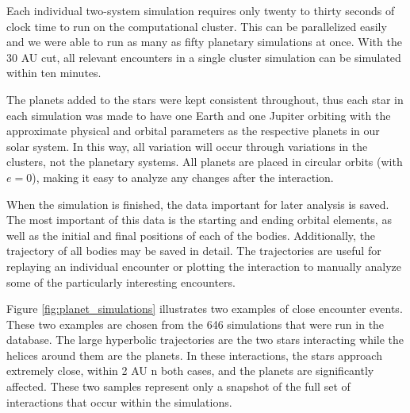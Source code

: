 \documentclass[12pt]{article}
\begin{document}

    Each individual two-system simulation requires only twenty to thirty
    seconds of clock time to run on the computational cluster. This can be
    parallelized easily and we were able to run as many as fifty
    planetary simulations at once. With the 30 AU cut, all relevant encounters 
    in a single cluster simulation can be simulated within ten minutes.

    The planets added to the stars were kept consistent throughout, thus 
    each star in each simulation was made to have one Earth and one Jupiter
    orbiting with the approximate physical and orbital
    parameters as the respective planets in our solar system. 
    In this way, all variation will occur through variations in the clusters, not
    the planetary systems.
    All planets are
    placed in circular orbits (with $e=0$), making it easy to analyze
    any changes after the interaction.

    When the simulation is finished, the data important for later analysis is
    saved. The most important of this data is the starting and ending
    orbital elements, as well as the initial and final positions of each of the bodies.
    Additionally, the trajectory of all bodies may be saved in detail. 
    The trajectories are useful for replaying an individual encounter or plotting the
    interaction to manually analyze some of the particularly interesting 
    encounters.

    Figure \ref{fig:planet_simulations} illustrates two examples of close encounter
    events. These two examples are chosen from the 646 %
    simulations
    that were run in the database. The large hyperbolic trajectories are the 
    two stars interacting while the helices around them are the planets. In these
    interactions, the stars approach extremely close, within 2 AU n both cases, and
    the planets are significantly affected. These two samples represent only
    a snapshot of the full set of interactions that occur within the simulations.
\end{document}
